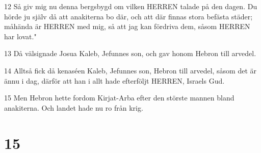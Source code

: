 \par 12 Så giv mig nu denna bergsbygd om vilken HERREN talade på den dagen. Du hörde ju själv då att anakiterna bo där, och att där finnas stora befästa städer; måhända är HERREN med mig, så att jag kan fördriva dem, såsom HERREN har lovat."
\par 13 Då välsignade Josua Kaleb, Jefunnes son, och gav honom Hebron till arvedel.
\par 14 Alltså fick då kenaséen Kaleb, Jefunnes son, Hebron till arvedel, såsom det är ännu i dag, därför att han i allt hade efterföljt HERREN, Israels Gud.
\par 15 Men Hebron hette fordom Kirjat-Arba efter den störste mannen bland anakiterna. Och landet hade nu ro från krig.

\chapter{15}

